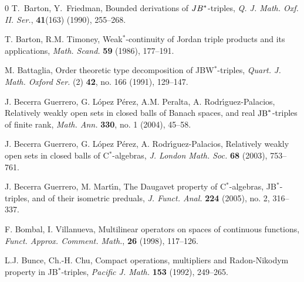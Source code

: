 \documentclass[10pt]{amsart}
\begin{document}
\begin{thebibliography}{0}
		 T.~{Barton}, Y.~{Friedman}, {Bounded derivations of $JB\sp*$-triples,} {\em {Q. J. Math. Oxf. II. Ser.}}, \textbf{41}(163) (1990), 255--268.
		
		 T. Barton, R.M. Timoney, Weak$^*$-continuity of Jordan triple products and its applications, \emph{Math. Scand.} \textbf{59} (1986), 177--191.
		
		
		 M. Battaglia, Order theoretic type decomposition of JBW$^*$-triples, \emph{Quart. J. Math. Oxford Ser.} (2) \textbf{42}, no. 166 (1991), 129--147.
		
		
		 J. Becerra Guerrero, G. L\'{o}pez P\'{e}rez, A.M. Peralta, A. Rodr\'{\i}guez-Palacios, Relatively weakly open sets in closed balls of Banach spaces, and real ${\rm JB}^*$-triples of finite rank, \emph{Math. Ann.} \textbf{330},  no. 1 (2004), 45--58.
		
		 J. Becerra Guerrero, G. L\'{o}pez P\'{e}rez, A. Rodr\'{\i}guez-Palacios, Relatively weakly open sets in closed balls of C$^*$-algebras, \emph{J. London Math. Soc.} \textbf{68} (2003), 753--761.
		
		 J. Becerra Guerrero, M. Mart\'{\i}n, The Daugavet property of C$^*$-algebras, JB$^*$-triples, and of their isometric preduals, \emph{J. Funct. Anal.} \textbf{224} (2005), no. 2, 316--337.
		
		 F. Bombal, I. Villanueva, Multilinear operators on spaces of continuous functions, \emph{Funct. Approx. Comment. Math.}, \textbf{26} (1998), 117--126.
		
		
		
		 L.J. Bunce, Ch.-H. Chu,  Compact  operations, multipliers and Radon-Nikodym property in JB$^*$-triples, \emph{Pacific J. Math.} \textbf{153} (1992), 249--265.
		
		
		

\end{thebibliography}
\end{document}
